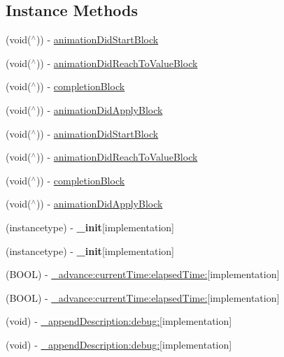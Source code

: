 \subsection*{Instance Methods}
\begin{DoxyCompactItemize}
\item 
(void($^\wedge$)) -\/ \mbox{\hyperlink{interface_p_o_p_animation_aa1e092d1ed9ba72340f8aefc71b8d817}{animation\+Did\+Start\+Block}}
\item 
(void($^\wedge$)) -\/ \mbox{\hyperlink{interface_p_o_p_animation_ab4e0f5edf809b633029e45797eabd196}{animation\+Did\+Reach\+To\+Value\+Block}}
\item 
(void($^\wedge$)) -\/ \mbox{\hyperlink{interface_p_o_p_animation_ab6461bce27fd84fc22f86a4560d2273f}{completion\+Block}}
\item 
(void($^\wedge$)) -\/ \mbox{\hyperlink{interface_p_o_p_animation_aaf4c9e53a36f1ad00866fff7359bb3f4}{animation\+Did\+Apply\+Block}}
\item 
(void($^\wedge$)) -\/ \mbox{\hyperlink{interface_p_o_p_animation_aa1e092d1ed9ba72340f8aefc71b8d817}{animation\+Did\+Start\+Block}}
\item 
(void($^\wedge$)) -\/ \mbox{\hyperlink{interface_p_o_p_animation_ab4e0f5edf809b633029e45797eabd196}{animation\+Did\+Reach\+To\+Value\+Block}}
\item 
(void($^\wedge$)) -\/ \mbox{\hyperlink{interface_p_o_p_animation_ab6461bce27fd84fc22f86a4560d2273f}{completion\+Block}}
\item 
(void($^\wedge$)) -\/ \mbox{\hyperlink{interface_p_o_p_animation_aaf4c9e53a36f1ad00866fff7359bb3f4}{animation\+Did\+Apply\+Block}}
\item 
\mbox{\label{interface_p_o_p_animation_a4a7c11161e29d98c82ffc8357a3a5c33}} 
(instancetype) -\/ {\bfseries \+\_\+init}{\ttfamily  \mbox{[}implementation\mbox{]}}
\item 
\mbox{\label{interface_p_o_p_animation_a4a7c11161e29d98c82ffc8357a3a5c33}} 
(instancetype) -\/ {\bfseries \+\_\+init}{\ttfamily  \mbox{[}implementation\mbox{]}}
\item 
(B\+O\+OL) -\/ \mbox{\hyperlink{interface_p_o_p_animation_a2156e24577e9e6b3dddf47c6b4249e7f}{\+\_\+advance\+:current\+Time\+:elapsed\+Time\+:}}{\ttfamily  \mbox{[}implementation\mbox{]}}
\item 
(B\+O\+OL) -\/ \mbox{\hyperlink{interface_p_o_p_animation_a2156e24577e9e6b3dddf47c6b4249e7f}{\+\_\+advance\+:current\+Time\+:elapsed\+Time\+:}}{\ttfamily  \mbox{[}implementation\mbox{]}}
\item 
(void) -\/ \mbox{\hyperlink{interface_p_o_p_animation_a4558b9f70108f420d045f2605eb76507}{\+\_\+append\+Description\+:debug\+:}}{\ttfamily  \mbox{[}implementation\mbox{]}}
\item 
(void) -\/ \mbox{\hyperlink{interface_p_o_p_animation_a4558b9f70108f420d045f2605eb76507}{\+\_\+append\+Description\+:debug\+:}}{\ttfamily  \mbox{[}implementation\mbox{]}}
\end{DoxyCompactItemize}

